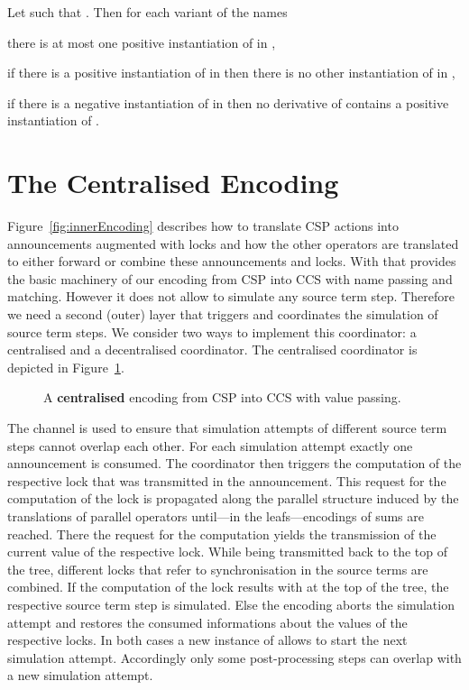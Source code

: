 \documentclass[copyright,creativecommons]{eptcs}
\begin{document}
\begin{lemma}
	Let  such that . Then for each variant  of the names 
	\begin{compactenum}
		\item there is at most one positive instantiation of  in ,
		\item if there is a positive instantiation of  in  then there is no other instantiation of  in ,
		\item if there is a negative instantiation of  in  then no derivative of  contains a positive instantiation of .
	\end{compactenum}
	\label{lem:sumLocks}
\end{lemma}

\section{The Centralised Encoding}
\label{sec:central}

Figure~\ref{fig:innerEncoding} describes how to translate CSP actions into announcements augmented with locks and how the other operators are translated to either forward or combine these announcements and locks. With that  provides the basic machinery of our encoding from CSP into CCS with name passing and matching. However it does not allow to simulate any source term step. Therefore we need a second (outer) layer that triggers and coordinates the simulation of source term steps. We consider two ways to implement this coordinator: a centralised and a decentralised coordinator. The centralised coordinator is depicted in Figure~\ref{fig:centralised}.

\begin{figure}
	
	\caption{A \textbf{centralised} encoding from CSP into CCS with value passing.}
	\label{fig:centralised}
\end{figure}

The channel  is used to ensure that simulation attempts of different source term steps cannot overlap each other. For each simulation attempt exactly one announcement is consumed. The coordinator then triggers the computation of the respective lock that was transmitted in the announcement. This request for the computation of the lock is propagated along the parallel structure induced by the translations of parallel operators until---in the leafs---encodings of sums are reached. There the request for the computation yields the transmission of the current value of the respective lock. While being transmitted back to the top of the tree, different locks that refer to synchronisation in the source terms are combined. If the computation of the lock results with  at the top of the tree, the respective source term step is simulated. Else the encoding aborts the simulation attempt and restores the consumed informations about the values of the respective locks. In both cases a new instance of  allows to start the next simulation attempt. Accordingly only some post-processing steps can overlap with a new simulation attempt.
\end{document}
